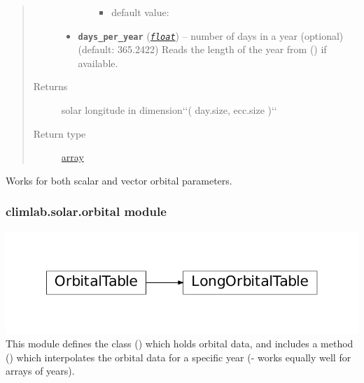 \documentclass[a4paper,10pt,english]{sphinxmanual}
\begin{document}
\begin{fulllineitems}
\begin{quote}
\begin{description}
\begin{itemize}
\begin{itemize}
\begin{itemize}
\item {} 
default value: 

\end{itemize}

\end{itemize}


\item {} 
\textbf{\texttt{days\_per\_year}} (\href{http://docs.python.org/2.7/library/functions.html\#float}{\emph{\texttt{float}}}) -- number of days in a year (optional) 
(default: 365.2422)
Reads the length of the year from 
{\hyperref[api/climlab.utils:module\string-climlab.utils.constants]{\emph{}}} () if available.

\end{itemize}

\item[{Returns}] \leavevmode
solar longitude 
in dimension{}`{}`( day.size, ecc.size ){}`{}`

\item[{Return type}] \leavevmode
\href{http://docs.python.org/2.7/library/array.html\#module-array}{array}

\end{description}\end{quote}

Works for both scalar and vector orbital parameters.

\end{fulllineitems}



\subsubsection{climlab.solar.orbital module}
\label{api/climlab.solar:climlab-solar-orbital-module}
\includegraphics{inheritance-a4659f72efbfa1da05c43c93e29674e4f4358872.pdf}
\label{api/climlab.solar:module-climlab.solar.orbital}
This module defines the class {\hyperref[api/climlab.solar:climlab.solar.orbital.OrbitalTable]{\emph{}}} () which holds orbital data,
and includes a method {\hyperref[api/climlab.solar:climlab.solar.orbital.OrbitalTable.lookup_parameters]{\emph{}}} () 
which interpolates the orbital data for a specific year 
(- works equally well for arrays of years).
\end{document}
